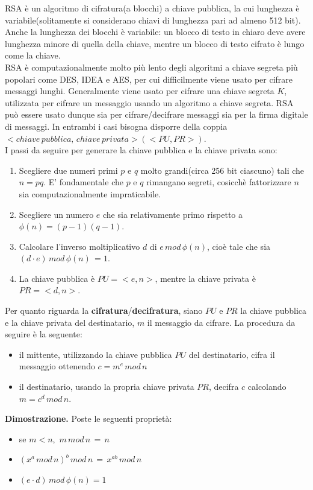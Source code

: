 RSA è un algoritmo di cifratura(a blocchi) a chiave pubblica, la cui lunghezza è variabile(solitamente si considerano chiavi di lunghezza pari ad almeno 512 bit). Anche la lunghezza dei blocchi è variabile: un blocco di testo in chiaro deve avere lunghezza minore di quella della chiave, mentre un blocco di testo cifrato è lungo come la chiave. \\
RSA è computazionalmente molto più lento degli algoritmi a chiave segreta più popolari come DES, IDEA e AES, per cui difficilmente viene usato per cifrare messaggi lunghi. Generalmente viene usato per cifrare una chiave segreta $K$, utilizzata per cifrare un messaggio usando un algoritmo a chiave segreta. RSA può essere usato dunque sia per cifrare/decifrare messaggi sia per la firma digitale di messaggi. In entrambi i casi bisogna disporre della coppia $<chiave \, pubblica, \,  chiave \, privata>(<PU,PR>)$. \\
I passi da seguire per generare la chiave pubblica e la chiave privata sono: \begin{enumerate}
\item Scegliere due numeri primi $p$ e $q$ molto grandi(circa 256 bit ciascuno) tali che $n = pq$. E' fondamentale che $p$ e $q$ rimangano segreti, cosicchè fattorizzare $n$ sia computazionalmente impraticabile. 
\item Scegliere un numero $e$ che sia relativamente primo rispetto a $\phi(n) = (p-1)(q-1)$.
\item Calcolare l'inverso moltiplicativo $d$ di $e \, mod \, \phi(n)$, cioè tale che sia $(d \cdot e ) \, mod \, \phi(n) \, = 1$.
\item La chiave pubblica è $PU = <e,n>$, mentre la chiave privata è $PR = <d,n>$.
\end{enumerate}
Per quanto riguarda la \textbf{cifratura}/\textbf{decifratura}, siano $PU$ e $PR$ la chiave pubblica e la chiave privata del destinatario, $m$ il messaggio da cifrare. La procedura da seguire è la seguente: \begin{itemize}
\item il mittente, utilizzando la chiave pubblica $PU$ del destinatario, cifra il messaggio ottenendo $c = m^e \, mod \, n$
\item il destinatario, usando la propria chiave privata $PR$, decifra $c$ calcolando $m = c^d \, mod \, n$. \end{itemize}
\textbf{Dimostrazione.} Poste le seguenti proprietà: \begin{itemize}
\item se $m<n$, $ \, m \, mod \, n\,=\,n$
\item $(x^a \, mod \, n)^b \, mod \, n \, = \, x^{ab} \, mod \, n$
\item $(e \cdot d) \, mod \, \phi(n) = 1$
\end{itemize}
